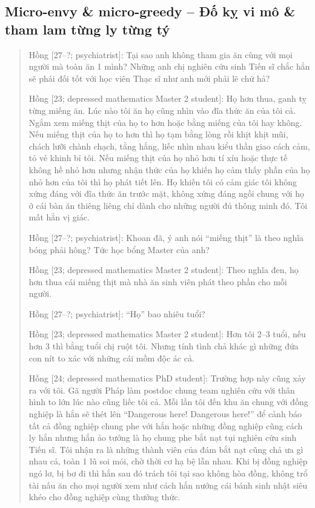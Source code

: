 \documentclass[12pt,oneside]{book}
\begin{document}
\subsection{Micro-envy \& micro-greedy -- Đố kỵ vi mô \& tham lam từng ly từng tý}

\begin{quote}
	{\sf Hồng [27--?; psychiatrist]}: Tại sao anh không tham gia ăn cùng với mọi người mà toàn ăn 1 mình? Những anh chị nghiên cứu sinh Tiến sĩ chắc hẳn sẽ phải đối tốt với học viên Thạc sĩ như anh mới phải lẽ chứ hả?
	
	{\sf Hồng [23; depressed mathematics Master 2 student]}: Họ hơn thua, ganh tỵ từng miếng ăn. Lúc nào tôi ăn họ cũng nhìn vào đĩa thức ăn của tôi cả. Ngắm xem miếng thịt của họ to hơn hoặc bằng miếng của tôi hay không. Nếu miếng thịt của họ to hơn thì họ tạm bằng lòng rồi khịt khịt mũi, chách lưỡi chành chạch, tằng hắng, liếc nhìn nhau kiểu thần giao cách cảm, tỏ vẻ khinh bỉ tôi. Nếu miếng thịt của họ nhỏ hơn tí xíu hoặc thực tế không hề nhỏ hơn nhưng nhận thức của họ khiến họ cảm thấy phần của họ nhỏ hơn của tôi thì họ phát tiết lên. Họ khiến tôi có cảm giác tôi không xứng đáng với đĩa thức ăn trước mặt, không xứng đáng ngồi chung với họ ở cái bàn ăn thiêng liêng chỉ dành cho những người đủ thông minh đó. Tôi mất hẳn vị giác.
	
	{\sf Hồng [27--?; psychiatrist]}: Khoan đã, ý anh nói ``miếng thịt'' là theo nghĩa bóng phải hông? Tức học bổng Master của anh?
	
	{\sf Hồng [23; depressed mathematics Master 2 student]}: Theo nghĩa đen, họ hơn thua cái miếng thịt mà nhà ăn sinh viên phát theo phần cho mỗi người.
	
	{\sf Hồng [27--?; psychiatrist]}: ``Họ'' bao nhiêu tuổi?
	
	{\sf Hồng [23; depressed mathematics Master 2 student]}: Hơn tôi 2--3 tuổi, nếu hơn 3 thì bằng tuổi chị ruột tôi. Nhưng tính tình chả khác gì những đứa con nít to xác với những cái mồm độc ác cả.
	
	{\sf Hồng [24; depressed mathematics PhD student]}: Trường hợp này cũng xảy ra với tôi. Gã người Pháp làm postdoc chung team nghiên cứu với thân hình to lớn lúc nào cũng liếc tôi cả. Mỗi lần tôi đến khu ăn chung với đồng nghiệp là hắn sẽ thét lên ``Dangerous here! Dangerous here!'' để cảnh báo tất cả đồng nghiệp chung phe với hắn hoặc những đồng nghiệp cũng cách ly hắn nhưng hắn ảo tưởng là họ chung phe bắt nạt tụi nghiên cứu sinh Tiến sĩ. Tôi nhận ra là những thành viên của đám bắt nạt cũng chả ưa gì nhau cả, toàn 1 lũ soi mói, chờ thời cơ hạ bệ lẫn nhau. Khi bị đồng nghiệp ngó lơ, bị bơ đi thì hắn sau đó trách tôi tại sao không hòa đồng, không trổ tài nấu ăn cho mọi người xem như cách hắn nướng cái bánh sinh nhật siêu khéo cho đồng nghiệp cùng thưởng thức.
	

\end{quote}
\end{document}
